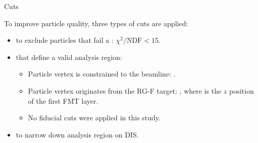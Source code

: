 \begin{frame}{Cuts}
    \label{11.21::summary}

    To improve particle quality, three types of cuts are applied:

    \vspace{12pt}

    \begin{itemize}
        \item
             to exclude particles that fail a : $\chi^2/\text{NDF} < 15$.

        \vspace{6pt}
        \item
             that define a valid analysis region:
            \begin{itemize}
                \vspace{6pt}
                \item
                    Particle vertex is constrained to the beamline: .

                \vspace{3pt}
                \item
                    Particle vertex originates from the RG-F target: , where  is the $z$ position of the first FMT layer.

                \vspace{3pt}
                \item
                    No fiducial cuts were applied in this study.
            \end{itemize}

        \vspace{6pt}
        \item
             to narrow down analysis region on DIS.
    \end{itemize}
\end{frame}

